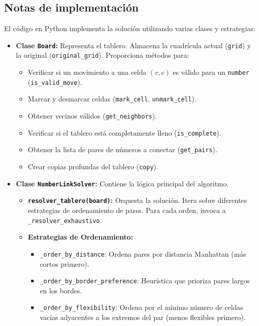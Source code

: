 \documentclass[spanish]{article}
\numberwithin{equation}{section}
\numberwithin{figure}{section}
\theoremstyle{definition}
\begin{document}
\subsection{Notas de implementación}
El código en Python implementa la solución utilizando varias clases y estrategias:
\begin{itemize}
    \item \textbf{Clase \texttt{Board}:} Representa el tablero. Almacena la cuadrícula actual (\texttt{grid}) y la original (\texttt{original\_grid}). Proporciona métodos para:
        \begin{itemize}
            \item Verificar si un movimiento a una celda $(r,c)$ es válido para un \texttt{number} (\texttt{is\_valid\_move}).
            \item Marcar y desmarcar celdas (\texttt{mark\_cell}, \texttt{unmark\_cell}).
            \item Obtener vecinos válidos (\texttt{get\_neighbors}).
            \item Verificar si el tablero está completamente lleno (\texttt{is\_complete}).
            \item Obtener la lista de pares de números a conectar (\texttt{get\_pairs}).
            \item Crear copias profundas del tablero (\texttt{copy}).
        \end{itemize}
    \item \textbf{Clase \texttt{NumberLinkSolver}:} Contiene la lógica principal del algoritmo.
        \begin{itemize}
            \item \textbf{\texttt{resolver\_tablero(board)}:} Orquesta la solución. Itera sobre diferentes estrategias de ordenamiento de pares. Para cada orden, invoca a \texttt{\_resolver\_exhaustivo}.
            \item \textbf{Estrategias de Ordenamiento:}
                \begin{itemize}
                    \item \texttt{\_order\_by\_distance}: Ordena pares por distancia Manhattan (más cortos primero).
                    \item \texttt{\_order\_by\_border\_preference}: Heurística que prioriza pares largos en los bordes.
                    \item \texttt{\_order\_by\_flexibility}: Ordena por el mínimo número de celdas vacías adyacentes a los extremos del par (menos flexibles primero).
                \end{itemize}

\end{itemize}
\end{itemize}
\end{document}
